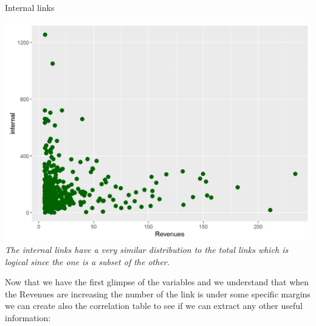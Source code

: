 \documentclass{article}
\begin{document}
\begin{table}[H]
\centering
\caption{Internal links}
\begin{center}
\includegraphics[scale=0.5]{../R/photos/28_int_rev.png}  \\
\textit{The internal links have a very similar distribution to the total links which is logical since the one is a subset of the other.}
\end{center}
\end{table}

Now that we have the first glimpse of the variables and we understand that when the Revenues are increasing the number of the link is under some specific margins we can create also the correlation table to see if we can extract any other useful information:
\end{document}
